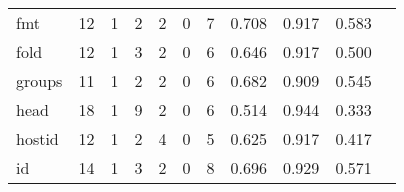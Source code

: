 \begin{longtable}{lp{1.20cm}p{1.20cm}p{1.20cm}p{1.20cm}p{1.20cm}p{1.20cm}p{1.20cm}p{1.20cm}p{1.20cm}p{1.20cm}}
fmt       &                                    12 &                                                  1 &                                                  2 &                                                  2 &                                                  0 &                                                  7 &                                         0.708 &                                              0.917 &                                              0.583 \\
fold      &                                    12 &                                                  1 &                                                  3 &                                                  2 &                                                  0 &                                                  6 &                                         0.646 &                                              0.917 &                                              0.500 \\
groups    &                                    11 &                                                  1 &                                                  2 &                                                  2 &                                                  0 &                                                  6 &                                         0.682 &                                              0.909 &                                              0.545 \\
head      &                                    18 &                                                  1 &                                                  9 &                                                  2 &                                                  0 &                                                  6 &                                         0.514 &                                              0.944 &                                              0.333 \\
hostid    &                                    12 &                                                  1 &                                                  2 &                                                  4 &                                                  0 &                                                  5 &                                         0.625 &                                              0.917 &                                              0.417 \\
id        &                                    14 &                                                  1 &                                                  3 &                                                  2 &                                                  0 &                                                  8 &                                         0.696 &                                              0.929 &                                              0.571 \\

\end{longtable}
